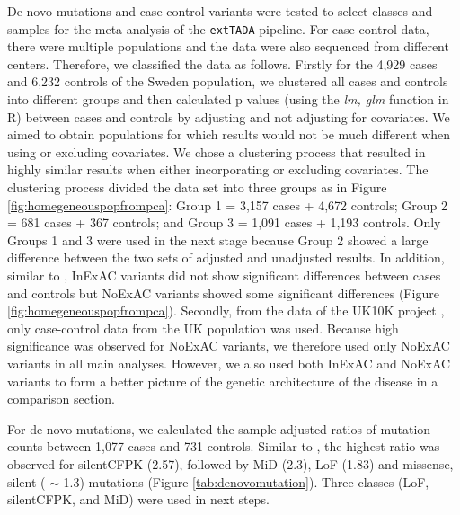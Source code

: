 \documentclass[]{article}
\begin{document}
De novo mutations and case-control variants were tested to select
classes and samples for the meta analysis of the \texttt{extTADA} pipeline.
For case-control data, there were multiple populations and the data
were also sequenced from different centers. Therefore, we classified
the data as follows. Firstly for the 4,929 cases and 6,232 controls of
the Sweden population, we clustered all
cases and controls into different groups and then calculated p values
(using the \emph{lm, glm} function in R) between cases and controls by adjusting and not adjusting
for covariates. We aimed to obtain populations for which results
would not be much different when using or excluding covariates.
We chose a clustering
process that resulted in highly similar results when either incorporating or excluding covariates. The clustering process divided the data set into
three groups as in Figure \ref{fig:homegeneouspopfrompca}: Group 1 =
3,157 cases + 4,672 controls; Group 2 = 681 cases + 367 controls;
and Group 3 = 1,091 cases + 1,193 controls. Only Groups 1 and 3 were
used in the next stage because Group 2 showed a large difference between the
two sets of adjusted and unadjusted results. In addition,
similar to \cite{genovese2016increased}, InExAC variants did
not show significant differences between cases and controls but NoExAC
variants showed some significant differences (Figure
\ref{fig:homegeneouspopfrompca}). Secondly, from the data of the UK10K project \citep{singh2016rare},
only case-control data from the UK population was used. Because high
significance was observed for NoExAC variants, we therefore used only NoExAC
variants in all main analyses. However, we also used both InExAC and
NoExAC variants to form a better picture of the genetic architecture
of the disease in a comparison section.


For de novo mutations, we calculated the sample-adjusted ratios of mutation counts
between 1,077 cases and 731 controls. Similar to
\cite{takata2016novo}, the highest ratio was observed for silentCFPK (2.57),
followed by MiD (2.3), LoF (1.83) and missense, silent ( $\sim $ 1.3)
mutations (Figure \ref{tab:denovomutation}). Three
classes (LoF, silentCFPK, and MiD) were used in next steps.
\end{document}
